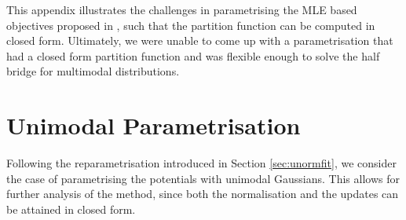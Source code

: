 \documentclass[a4paper,12pt,twoside,openright]{report}
\theoremstyle{definition}
\begin{document}
This appendix illustrates the challenges in parametrising the MLE based objectives proposed in \cite{pavon2018data}, such that the partition function can be computed in closed form. Ultimately, we were unable to come up with a parametrisation that had a closed form partition function and was flexible enough to solve the half bridge for multimodal distributions.

\section{Unimodal Parametrisation}

Following the reparametrisation introduced in Section \ref{sec:unormfit}, we consider the case of parametrising the potentials with unimodal Gaussians. This allows for further analysis of the method, since both the normalisation and the updates can be attained in closed form. 
\end{document}
